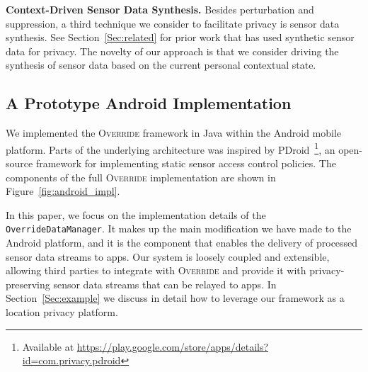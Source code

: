\documentclass[10pt]{sensys-proc}
\begin{document}
\textbf{Context-Driven Sensor Data Synthesis.} Besides perturbation and suppression, a third technique we consider to facilitate privacy is sensor data synthesis. See Section~\ref{Sec:related} for prior work that has used synthetic sensor data for privacy. The novelty of our approach is that we consider driving the synthesis of sensor data based on the current personal contextual state.

\subsection{A Prototype Android Implementation}
\label{sec:implementation}
We implemented the \textsc{Override} framework in Java within the Android mobile platform. Parts of the underlying architecture was inspired by PDroid~\footnote{Available at \url{https://play.google.com/store/apps/details?id=com.privacy.pdroid}}, an open-source framework for implementing static sensor access control policies. The components of the full \textsc{Override} implementation are shown in Figure~\ref{fig:android_impl}.

In this paper, we focus on the implementation details of the \texttt{OverrideDataManager}. It makes up the main modification we have made to the Android platform, and it is the component that enables the delivery of processed sensor data streams to apps. Our system is loosely coupled and extensible, allowing third parties to integrate with \textsc{Override} and provide it with privacy-preserving sensor data streams that can be relayed to apps. In Section~\ref{Sec:example} we discuss in detail how to leverage our framework as a location privacy platform.
\end{document}
